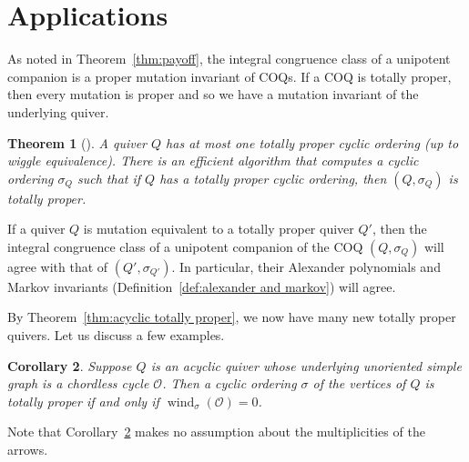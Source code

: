 \documentclass[11pt, letterpaper]{amsart}
\newtheorem{theorem}{Theorem}[section]
\newtheorem{corollary}[theorem]{Corollary}
\theoremstyle{definition}
\numberwithin{equation}{section}
\def\wind{{\operatorname{wind}}}
\begin{document}
\newpage %
\section{Applications}
\label{sec:cor}

As noted in Theorem~\ref{thm:payoff}, the integral congruence class of a unipotent companion is a proper mutation invariant of COQs. 
If a COQ is totally proper, then every mutation is proper and so we have a mutation invariant of the underlying quiver. 

\begin{theorem}[{\cite[Theorem~14.3, Algorithm~14.12]{COQ}}]
\label{thm:uniq}
A quiver $Q$ has at most one totally proper cyclic ordering (up to wiggle equivalence).
There is an efficient algorithm that computes a cyclic ordering $\sigma_Q$ such that if $Q$ has a totally proper cyclic ordering, then $(Q, \sigma_Q)$ is totally proper.
\end{theorem}

If a quiver $Q$ is mutation equivalent to a totally proper quiver $Q'$, then the integral congruence class of a unipotent companion of the COQ $(Q, \sigma_Q)$ will agree with that of $(Q', \sigma_{Q'})$. 
In particular, their Alexander polynomials and Markov invariants (Definition~\ref{def:alexander and markov}) will agree.

By Theorem~\ref{thm:acyclic totally proper}, we now have many new totally proper quivers. 
Let us discuss a few examples.

\begin{corollary}
\label{cor:acyclic cycles}
Suppose $Q$ is an acyclic quiver whose underlying unoriented simple graph is a chordless cycle $\mathcal O$.
Then a cyclic ordering $\sigma$ of the vertices of $Q$ is totally proper if and only if $\wind_\sigma(\mathcal O) = 0$.
\end{corollary}

Note that Corollary~\ref{cor:acyclic cycles} makes no assumption about the multiplicities of the arrows.
\end{document}
